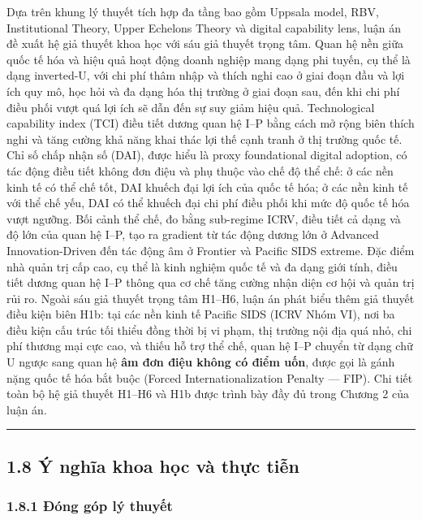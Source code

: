 \documentclass[12pt,a4paper]{article}
\begin{document}
Dựa trên khung lý thuyết tích hợp đa tầng bao gồm Uppsala model, RBV,
Institutional Theory, Upper Echelons Theory và digital capability lens,
luận án đề xuất hệ giả thuyết khoa học với sáu giả thuyết trọng tâm.
Quan hệ nền giữa quốc tế hóa và hiệu quả hoạt động doanh nghiệp mang
dạng phi tuyến, cụ thể là dạng inverted-U, với chi phí thâm nhập và
thích nghi cao ở giai đoạn đầu và lợi ích quy mô, học hỏi và đa dạng hóa
thị trường ở giai đoạn sau, đến khi chi phí điều phối vượt quá lợi ích
sẽ dẫn đến sự suy giảm hiệu quả. Technological capability index (TCI)
điều tiết dương quan hệ I--P bằng cách mở rộng biên thích nghi và tăng
cường khả năng khai thác lợi thế cạnh tranh ở thị trường quốc tế. Chỉ số
chấp nhận số (DAI), được hiểu là proxy foundational digital adoption, có
tác động điều tiết không đơn điệu và phụ thuộc vào chế độ thể chế: ở các
nền kinh tế có thể chế tốt, DAI khuếch đại lợi ích của quốc tế hóa; ở
các nền kinh tế với thể chế yếu, DAI có thể khuếch đại chi phí điều phối
khi mức độ quốc tế hóa vượt ngưỡng. Bối cảnh thể chế, đo bằng sub-regime
ICRV, điều tiết cả dạng và độ lớn của quan hệ I--P, tạo ra gradient từ
tác động dương lớn ở Advanced Innovation-Driven đến tác động âm ở
Frontier và Pacific SIDS extreme. Đặc điểm nhà quản trị cấp cao, cụ thể
là kinh nghiệm quốc tế và đa dạng giới tính, điều tiết dương quan hệ
I--P thông qua cơ chế tăng cường nhận diện cơ hội và quản trị rủi ro.
Ngoài sáu giả thuyết trọng tâm H1--H6, luận án phát biểu thêm giả thuyết
điều kiện biên H1b: tại các nền kinh tế Pacific SIDS (ICRV Nhóm VI), nơi
ba điều kiện cấu trúc tối thiểu đồng thời bị vi phạm, thị trường nội địa
quá nhỏ, chi phí thương mại cực cao, và thiếu hỗ trợ thể chế, quan hệ
I--P chuyển từ dạng chữ U ngược sang quan hệ \textbf{âm đơn điệu không
có điểm uốn}, được gọi là gánh nặng quốc tế hóa bắt buộc (Forced
Internationalization Penalty --- FIP). Chi tiết toàn bộ hệ giả thuyết
H1--H6 và H1b được trình bày đầy đủ trong Chương 2 của luận án.

\begin{center}\rule{0.5\linewidth}{0.5pt}\end{center}

\hypertarget{18-uxfd-nghux129a-khoa-hux1ecdc-vuxe0-thux1ef1c-tiux1ec5n}{%
\subsection{1.8 Ý nghĩa khoa học và thực
tiễn}\label{18-uxfd-nghux129a-khoa-hux1ecdc-vuxe0-thux1ef1c-tiux1ec5n}}

\hypertarget{181-ux111uxf3ng-guxf3p-luxfd-thuyux1ebft}{%
\subsubsection{1.8.1 Đóng góp lý
thuyết}\label{181-ux111uxf3ng-guxf3p-luxfd-thuyux1ebft}}
\end{document}
